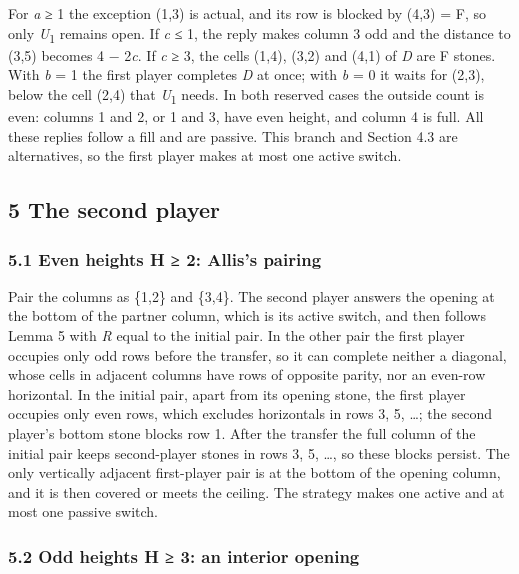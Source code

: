 \documentclass[
  a4paper,
]{article}
\begin{document}
For \emph{a} ≥ 1 the exception (1,3) is actual, and its row is blocked
by (4,3) = F, so only \emph{U}\textsubscript{1} remains open. If
\emph{c} ≤ 1, the reply makes column 3 odd and the distance to (3,5)
becomes 4 − 2\emph{c}. If \emph{c} ≥ 3, the cells (1,4), (3,2) and (4,1)
of \emph{D} are F stones. With \emph{b} = 1 the first player completes
\emph{D} at once; with \emph{b} = 0 it waits for (2,3), below the cell
(2,4) that \emph{U}\textsubscript{1} needs. In both reserved cases the
outside count is even: columns 1 and 2, or 1 and 3, have even height,
and column 4 is full. All these replies follow a fill and are passive.
This branch and Section 4.3 are alternatives, so the first player makes
at most one active switch.

\subsection{5 The second player}\label{the-second-player}

\subsubsection{5.1 Even heights H ≥ 2: Allis's
pairing}\label{even-heights-h-2-alliss-pairing}

Pair the columns as \{1,2\} and \{3,4\}. The second player answers the
opening at the bottom of the partner column, which is its active switch,
and then follows Lemma 5 with \emph{R} equal to the initial pair. In the
other pair the first player occupies only odd rows before the transfer,
so it can complete neither a diagonal, whose cells in adjacent columns
have rows of opposite parity, nor an even-row horizontal. In the initial
pair, apart from its opening stone, the first player occupies only even
rows, which excludes horizontals in rows 3, 5, \ldots; the second
player's bottom stone blocks row 1. After the transfer the full column
of the initial pair keeps second-player stones in rows 3, 5, \ldots, so
these blocks persist. The only vertically adjacent first-player pair is
at the bottom of the opening column, and it is then covered or meets the
ceiling. The strategy makes one active and at most one passive switch.

\subsubsection{5.2 Odd heights H ≥ 3: an interior
opening}\label{odd-heights-h-3-an-interior-opening}
\end{document}
